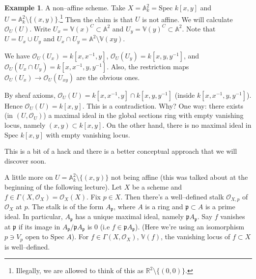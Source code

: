 \documentclass{article}
\theoremstyle{definition}
\newtheorem{example}{Example}[section]
\begin{document}
\begin{example}
    A non--affine scheme. Take $X = \mathbb{A}_k^2 = \text{Spec }k[x,y]$ and $U = \mathbb{A}_k^2 \setminus \{(x,y)\}$.\footnote{Illegally, we are allowed to think of this as $\mathbb{R}^2 \setminus \{(0,0)\}$.} Then the claim is that $U$ is not affine. We will calculate $\mathcal{O}_U(U)$. Write $U_x = \mathbb{V}(x)^{C} \subset \mathbb{A}^2$ and $U_y = \mathbb{V}(y)^{C} \subset \mathbb{A}^2$. Note that $U = U_x \cup U_y$ and $U_x \cap U_y = \mathbb{A}^2 \setminus \mathbb{V}(xy)$. \vspace{1mm}
     
    We have $\mathcal{O}_U(U_x) = k[x,x^{-1}, y]$, $\mathcal{O}_U(U_y) = k[x,y,y^{-1}]$, and $\mathcal{O}_U(U_x \cap U_y) = k[x,x^{-1},y,y^{-1}]$. Also, the restriction maps $\mathcal{O}_U(U_x) \to \mathcal{O}_U(U_{xy})$ are the obvious ones.
    \vspace{1mm}
     
    By sheaf axioms, $\mathcal{O}_U(U) = k[x,x^{-1},y] \cap k[x,y,y^{-1}]$ (inside $k[x,x^{-1},y,y^{-1}]$). Hence $\mathcal{O}_U(U) = k[x,y]$. This is a contradiction. Why? One way: there exists (in $(U, \mathcal{O}_U)$) a maximal ideal in the global sections ring with empty vanishing locus, namely $(x,y) \subset k[x,y]$. On the other hand, there is no maximal ideal in $\text{Spec }k[x,y]$ with empty vanishing locus. 
    \vspace{1mm}
     
    This is a bit of a hack and there is a better conceptual approach that we will discover soon.
    \vspace{1mm}
     
    A little more on $U = \mathbb{A}_k^2 \setminus  \{(x,y)\}$ not being affine (this was talked about at the beginning of the following lecture). Let $X$ be a scheme and $f \in \Gamma(X,\mathcal{O}_X) = \mathcal{O}_X(X)$. Fix $p \in X$. Then there's a well--defined stalk $\mathcal{O}_{X,p}$ of $\mathcal{O}_X$ at $p$.
    The stalk is of the form $A_\mathfrak{p}$, where $A$ is a ring and $\mathfrak{p}\subset A$ is a prime ideal. In particular, $A_\mathfrak{p}$ has a unique maximal ideal, namely $\mathfrak{p} A_\mathfrak{p}$. Say $f$ vanishes at $\mathfrak{p}$ if its image in $A_\mathfrak{p}/\mathfrak{p}A_\mathfrak{p}$ is 0 (i.e $f \in \mathfrak{p}A_{\mathfrak{p}}$). (Here we're using an isomorphism $p \ni V_p$ open to $\text{Spec }A$). For $f \in \Gamma(X,\mathcal{O}_X)$, $\mathbb{V}(f)$, the vanishing locus of $f \subset X$ is well--defined.
\end{example}
\end{document}
